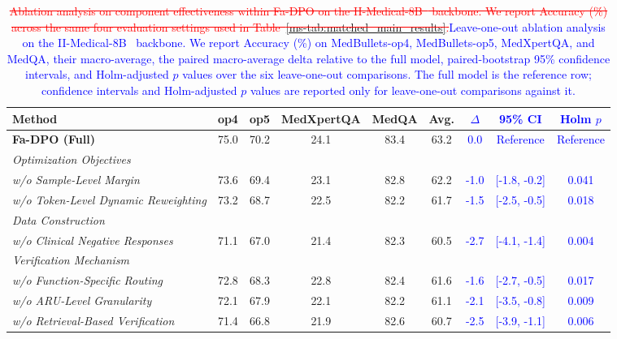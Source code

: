 \documentclass[12pt]{article}
\newcommand{\deleted}[1]{\textcolor{red}{\sout{#1}}}
\newcommand{\added}[1]{\textcolor{blue}{#1}}
\begin{document}
\begin{table}[htbp]
\centering
\scriptsize
\caption{\deleted{Ablation analysis on component effectiveness within Fa-DPO on the II-Medical-8B~\cite{intelligentinternet2025iimedical8b} backbone. We report Accuracy (\%) across the same four evaluation settings used in Table~\ref*{ms-tab:matched_main_results}.}\added{Leave-one-out ablation analysis on the II-Medical-8B~\cite{intelligentinternet2025iimedical8b} backbone. We report Accuracy (\%) on MedBullets-op4, MedBullets-op5, MedXpertQA, and MedQA, their macro-average, the paired macro-average delta relative to the full model, paired-bootstrap 95\% confidence intervals, and Holm-adjusted $p$ values over the six leave-one-out comparisons. The full model is the reference row; confidence intervals and Holm-adjusted $p$ values are reported only for leave-one-out comparisons against it.}}
\label{tab:response_r114_leave_one_out}
\label{tab:ablation}
\begin{adjustbox}{max width=\textwidth}
\begin{tabular}{lcccccccc}
\toprule
\textbf{Method} & \textbf{op4} & \textbf{op5} & \textbf{MedXpertQA} & \textbf{MedQA} & \textbf{Avg.} & \added{\textbf{$\Delta$}} & \added{\textbf{95\% CI}} & \added{\textbf{Holm $p$}} \\
\midrule
\textbf{Fa-DPO (Full)} & 75.0 & 70.2 & 24.1 & 83.4 & 63.2 & \added{0.0} & \added{Reference} & \added{Reference} \\
\midrule
\multicolumn{9}{l}{\textit{Optimization Objectives}} \\
\quad \textit{w/o Sample-Level Margin} & 73.6 & 69.4 & 23.1 & 82.8 & 62.2 & \added{-1.0} & \added{[-1.8, -0.2]} & \added{0.041} \\
\quad \textit{w/o Token-Level Dynamic Reweighting} & 73.2 & 68.7 & 22.5 & 82.2 & 61.7 & \added{-1.5} & \added{[-2.5, -0.5]} & \added{0.018} \\
\midrule
\multicolumn{9}{l}{\textit{Data Construction}} \\
\quad \textit{w/o Clinical Negative Responses} & 71.1 & 67.0 & 21.4 & 82.3 & 60.5 & \added{-2.7} & \added{[-4.1, -1.4]} & \added{0.004} \\
\midrule
\multicolumn{9}{l}{\textit{Verification Mechanism}} \\
\quad \textit{w/o Function-Specific Routing} & 72.8 & 68.3 & 22.8 & 82.4 & 61.6 & \added{-1.6} & \added{[-2.7, -0.5]} & \added{0.017} \\
\quad \textit{w/o ARU-Level Granularity} & 72.1 & 67.9 & 22.1 & 82.2 & 61.1 & \added{-2.1} & \added{[-3.5, -0.8]} & \added{0.009} \\
\quad \textit{w/o Retrieval-Based Verification} & 71.4 & 66.8 & 21.9 & 82.6 & 60.7 & \added{-2.5} & \added{[-3.9, -1.1]} & \added{0.006} \\
\bottomrule
\end{tabular}
\end{adjustbox}
\end{table}
\end{document}
